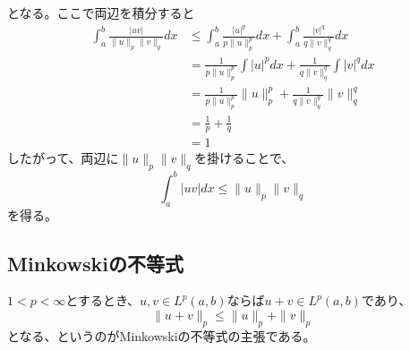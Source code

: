 \documentclass[a4paper,10pt]{jsarticle}
\begin{document}
となる。ここで両辺を積分すると
\begin{align}
 \int_a^b \frac{|uv|}{\|u\|_p\|v\|_q}dx &\le \int_a^b \frac{|u|^p}{p\|u\|_p^p} dx + \int_a^b \frac{|v|^q}{q\|v\|_q^q} dx \\
  & = \frac{1}{p\|u\|_p^p}\int |u|^p dx + \frac{1}{q\|v\|_q^q}\int |v|^q dx \\
  & = \frac{1}{p\|u\|_p^p}\|u\|_p^p + \frac{1}{q\|v\|_q^q}\|v\|_q^q \\
  & = \frac{1}{p} + \frac{1}{q} \\
  & = 1
\end{align}
したがって、両辺に$\|u\|_p\|v\|_q$を掛けることで、
\begin{equation}
 \int_a^b |uv|dx \le \|u\|_p\|v\|_q
\end{equation}
を得る。
\subsection{Minkowskiの不等式}
$1<p<\infty$とするとき、$u,v\in L^p(a, b)$ならば$u+v\in L^p(a, b)$であり、
\begin{equation}
 \|u+v\|_p\le\|u\|_p + \|v\|_p
\end{equation}
となる、というのがMinkowskiの不等式の主張である。\\
\end{document}

